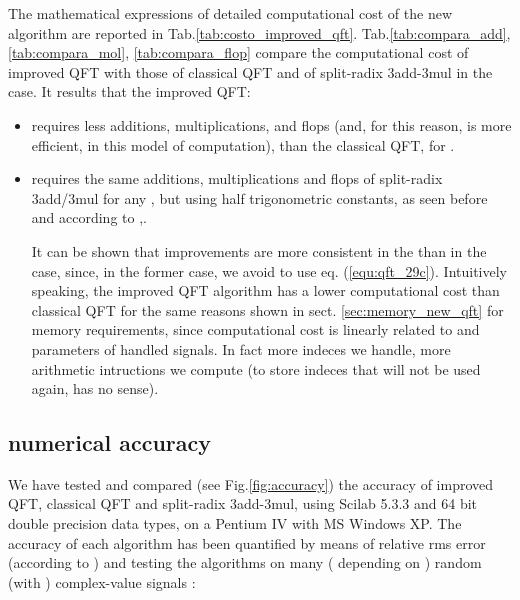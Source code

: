 \documentclass[a4paper,10pt]{article}
\begin{document}
The mathematical expressions of detailed computational cost of the new algorithm are reported in Tab.\ref{tab:costo_improved_qft}. 
Tab.\ref{tab:compara_add}, \ref{tab:compara_mol}, \ref{tab:compara_flop} compare the computational cost of improved QFT with those of classical QFT and of split-radix 3add-3mul \cite{Sorensen_1986} in the  case.
It results that the improved QFT:
\begin{itemize}


\item
requires less additions, multiplications, and flops (and, for this reason, is more efficient, in this model of computation), than the classical QFT, for . 

\item 
requires the same additions, multiplications and flops of split-radix 3add/3mul for any , but using half trigonometric constants, as seen before and according to \cite{Johnson_Frigo_2007},\cite{Sorensen_1986}.

It can be shown that improvements are more consistent in the  than in the  case, since, in the former case, we avoid to use eq. (\ref{equ:qft_29c}). 
Intuitively speaking, the improved QFT algorithm has a lower computational cost than classical QFT for the same reasons shown in sect. \ref{sec:memory_new_qft} for memory requirements, since computational cost is linearly related to  and  parameters of handled signals. 
In fact more indeces we handle, more arithmetic intructions we compute (to store indeces that will not be used again, has no sense).



\end{itemize}









\subsection{numerical accuracy} \label{sec:accuracy}

We have tested and compared  (see Fig.\ref{fig:accuracy}) the accuracy of improved QFT, classical QFT and split-radix 3add-3mul, using Scilab 5.3.3 and 64 bit double precision data types, on a Pentium IV with MS Windows XP.
The accuracy of each algorithm has been quantified by means of relative rms error (according to \cite{Johnson_Frigo_2007}) and testing the algorithms on many ( depending on )  random (with ) complex-value signals :
\end{document}
